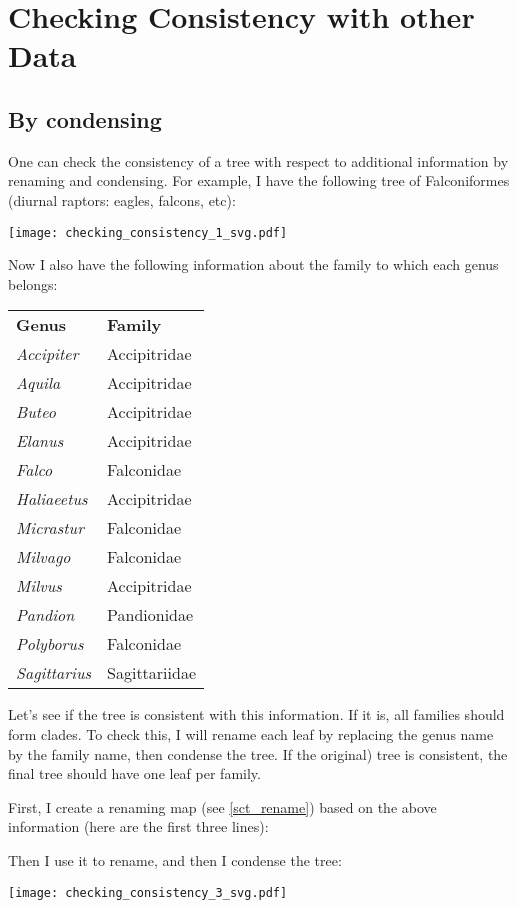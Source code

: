 \section{Checking Consistency with other Data}
\label{sct_check_consistency}

\subsection{By condensing}

One can check the consistency of a tree with respect to additional information
by renaming and condensing. For example, I have the following tree of
Falconiformes (diurnal raptors: eagles, falcons, etc):

\texttt{[image: checking\_consistency\_1\_svg.pdf]}

\noindent{}Now I also have the following information about the family to which each genus belongs:

\bigskip{}
\begin{tabular}{ll}
\textbf{Genus} & \textbf{Family} \\
\textit{Accipiter} & Accipitridae \\
\textit{Aquila} & Accipitridae \\
\textit{Buteo} & Accipitridae \\
\textit{Elanus} & Accipitridae \\
\textit{Falco} & Falconidae \\
\textit{Haliaeetus} & Accipitridae \\
\textit{Micrastur} & Falconidae \\
\textit{Milvago} & Falconidae \\
\textit{Milvus} & Accipitridae \\
\textit{Pandion} & Pandionidae \\
\textit{Polyborus} & Falconidae \\
\textit{Sagittarius} & Sagittariidae
\end{tabular}
\bigskip{}

Let's see if the tree is consistent with this information. If it is, all
families should form clades. To check this, I will rename each leaf by
replacing the genus name by the family name, then condense the tree. If the
original) tree is consistent, the final tree should have one leaf per family.

First, I create a renaming map (see \ref{sct_rename}) based on the above
information (here are the first three lines):


Then I use it to rename, and then I condense the tree:

\texttt{[image: checking\_consistency\_3\_svg.pdf]}

